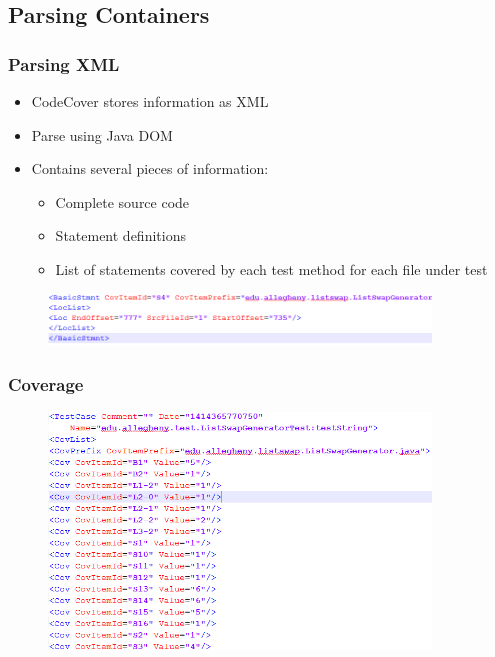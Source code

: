 \documentclass{beamer}
\begin{document}
	\subsection{Parsing Containers}
	\begin{frame}
	\frametitle{Parsing XML}
	\begin{itemize}
		\item CodeCover stores information as XML
		\pause
		\item Parse using Java DOM
		\pause
    	\item Contains several pieces of information:
    	\pause
    	\begin{itemize}
    		\item Complete source code
    		\item Statement definitions
    		\item List of statements covered by each test method for each file under test
    		\pause
    	\end{itemize}
	\end{itemize}
	\begin{figure}
		\label{xmlstat}
		\includegraphics[width=4in]{img/xmlstatement}
	\end{figure}
	\end{frame}	
	\begin{frame}
	\frametitle{Coverage}
	  	\begin{figure}
	  		\label{xmlcov}
	  		\includegraphics[width=4in]{img/xmlcoverage}
	  	\end{figure}
	\end{frame}
\end{document}
